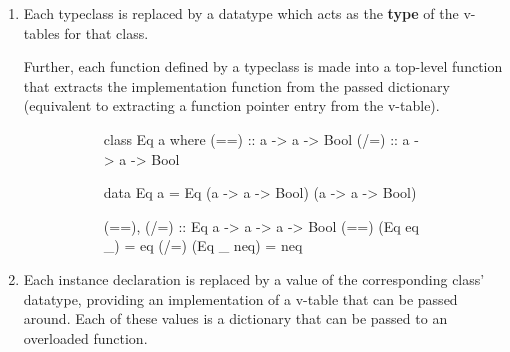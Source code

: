 \documentclass[dissertation.tex]{subfiles}
\begin{document}
{{{            \begin{enumerate}
            \item
            {
                Each typeclass is replaced by a datatype which acts as the \textbf{type} of the v-tables for that class.

                Further, each function defined by a typeclass is made into a top-level function that extracts the implementation function from the passed dictionary (equivalent to extracting a function
                pointer entry from the v-table).

                \begin{figure}[H]
                \centering
                \begin{subfigure}[t]{0.35\textwidth}
                \begin{haskellfigure}
                class Eq a where
                    (==) :: a -> a -> Bool
                    (/=) :: a -> a -> Bool
                \end{haskellfigure}
                \end{subfigure}
                \hspace{5mm}
                \begin{subfigure}[t]{0.55\textwidth}
                \begin{haskellfigure}
                data Eq a = Eq (a -> a -> Bool) (a -> a -> Bool)

                (==), (/=) :: Eq a -> a -> a -> Bool
                (==) (Eq eq _) = eq
                (/=) (Eq _ neq) = neq
                \end{haskellfigure}
                \end{subfigure}
                \end{figure}
            }
            \item
            {
                Each instance declaration is replaced by a value of the corresponding class' datatype, providing an
                implementation of a v-table that can be passed around. Each of these values is a dictionary that can be
                passed to an overloaded function.

}
\end{enumerate}}}}
\end{document}
